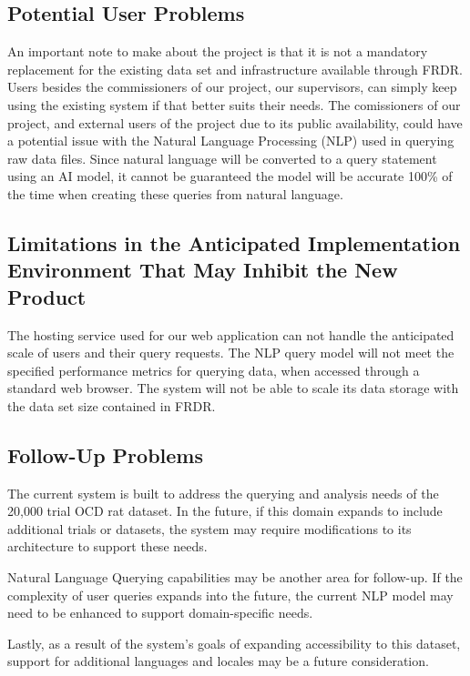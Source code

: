 \documentclass[12pt]{article}
\begin{document}
\subsection{Potential User Problems}

\par{An important note to make about the project is that it is not a mandatory replacement for the existing data set and infrastructure 
available through FRDR. Users besides the commissioners of our project, our supervisors, can simply keep using the existing system 
if that better suits their needs. \newline \indent The comissioners of our project, and external users of the project due to its public 
availability, could have a potential issue with the Natural Language Processing (NLP) used in querying raw data files. Since natural language 
will be converted to a query statement using an AI model, it cannot be guaranteed the model will be accurate 100\% of the time when 
creating these queries from natural language.}

\subsection{Limitations in the Anticipated Implementation Environment That May
Inhibit the New Product}

\par{The hosting service used for our web application can not handle the anticipated scale of users and their query requests. \newline \indent
The NLP query model will not meet the specified performance metrics for querying data, when accessed through a standard web browser. \newline \indent
The system will not be able to scale its data storage with the data set size contained in FRDR.}

\subsection{Follow-Up Problems}

\par{The current system is built to address the querying and analysis needs of the 20,000 trial OCD rat dataset. In the future, if this domain expands to include additional trials or datasets, the system may require modifications to its architecture to support these needs. }
\par{ Natural Language Querying capabilities may be another area for follow-up. If the complexity of user queries expands into the future, the current NLP model may need to be enhanced to support domain-specific needs.  }
\par{Lastly, as a result of the system's goals of expanding accessibility to this dataset, support for additional languages and locales may be a future consideration. }
\end{document}
